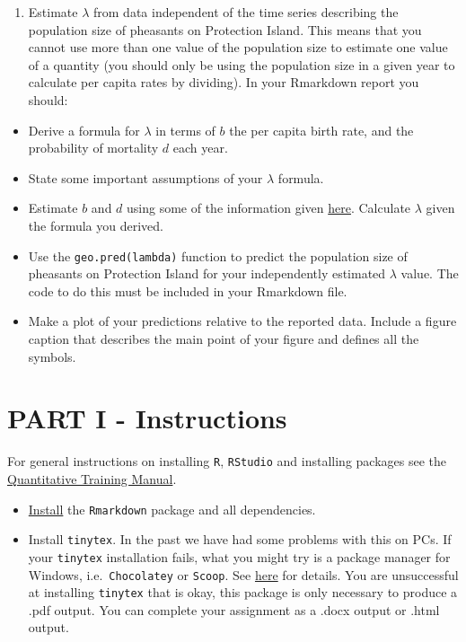 \documentclass[
]{book}
\providecommand{\tightlist}{%
  \setlength{\itemsep}{0pt}\setlength{\parskip}{0pt}}
\begin{document}
\begin{enumerate}
\def\labelenumi{\arabic{enumi}.}
\setcounter{enumi}{2}
\tightlist
\item
  Estimate \(\lambda\) from data independent of the time series describing the population size of pheasants on Protection Island. This means that you cannot use more than one value of the population size to estimate one value of a quantity (you should only be using the population size in a given year to calculate per capita rates by dividing). In your Rmarkdown report you should:
\end{enumerate}

\begin{itemize}
\item
  Derive a formula for \(\lambda\) in terms of \(b\) the per capita birth rate, and the probability of mortality \(d\) each year.
\item
  State some important assumptions of your \(\lambda\) formula.
\item
  Estimate \(b\) and \(d\) using some of the information given \protect\hyperlink{pheasant}{here}. Calculate \(\lambda\) given the formula you derived.
\item
  Use the \texttt{geo.pred(lambda)} function to predict the population size of pheasants on Protection Island for your independently estimated \(\lambda\) value. The code to do this must be included in your Rmarkdown file.
\item
  Make a plot of your predictions relative to the reported data. Include a figure caption that describes the main point of your figure and defines all the symbols.
\end{itemize}

\hypertarget{partI}{%
\chapter*{PART I - Instructions}\label{partI}}

For general instructions on installing \texttt{R}, \texttt{RStudio} and installing packages see the \href{https://ahurford.github.io/quant-guide-all-courses/}{Quantitative Training Manual}.

\begin{itemize}
\tightlist
\item
  \href{https://ahurford.github.io/quant-guide-all-courses/install.html}{Install} the \texttt{Rmarkdown} package and all dependencies.
\item
  Install \texttt{tinytex}. In the past we have had some problems with this on PCs. If your \texttt{tinytex} installation fails, what you might try is a package manager for Windows, i.e.~\texttt{Chocolatey} or \texttt{Scoop}. See \href{https://github.com/rstudio/tinytex-releases}{here} for details. You are unsuccessful at installing \texttt{tinytex} that is okay, this package is only necessary to produce a .pdf output. You can complete your assignment as a .docx output or .html output.
\end{itemize}
\end{document}
